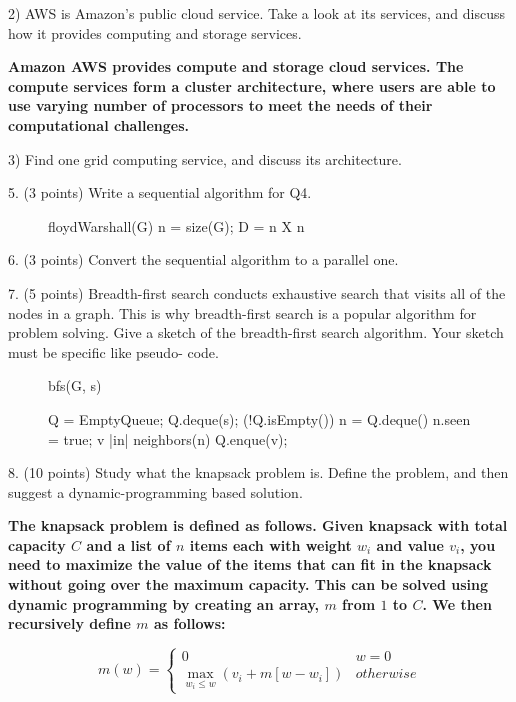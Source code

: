 \documentclass[11pt]{article}
\begin{document}
2) AWS is Amazon's public cloud service. Take a look at its services, and discuss how it provides computing and storage services.

{\bf
Amazon AWS provides compute and storage cloud services.  The compute services form a cluster architecture, where users are able to use varying number of processors to meet the needs of their computational challenges.  
}

3) Find one grid computing service, and discuss its architecture.

5. (3 points) Write a sequential algorithm for Q4.

\begin{figure}[h]
\begin{program}
\PROC floydWarshall(G) \BODY
	n = size(G); 
	D =  n \; X \; n 
	\FOR 
	
\END
\end{program}
\end{figure}


6. (3 points) Convert the sequential algorithm to a parallel one.

7. (5 points) Breadth-first search conducts exhaustive search that visits all of the nodes in a graph. This is why breadth-first search is a popular algorithm for problem solving. Give a sketch of the breadth-first search algorithm. Your sketch must be specific like pseudo- code.

\begin{figure}[h]

\begin{program}
\PROC bfs(G, s) \BODY

	Q = EmptyQueue;
	Q.deque(s);
	\WHILE(!Q.isEmpty()) \DO
		n = Q.deque()
		n.seen = true;
		\FOR v\; |in| \; neighbors(n)\; \DO
			Q.enque(v);
		\END
	\END
	
\END
\end{program}

\end{figure}

8. (10 points) Study what the knapsack problem is. Define the problem, and then suggest a dynamic-programming based solution.

{\bf The knapsack problem is defined as follows.  Given knapsack with total capacity $C$ and a list of $n$ items each with weight $w_i$ and value $v_i$, you need to maximize the value of the items that can fit in the knapsack without going over the maximum capacity.  This can be solved using dynamic programming by creating an array, $m$ from $1$ to $C$. We then recursively define $m$ as follows:

\[
m(w) = \begin{cases}
	0& w = 0 \\
	\max\limits_{w_i \le w}(v_i + m[w - w_i]) & otherwise
\end{cases}
\]}
\end{document}
